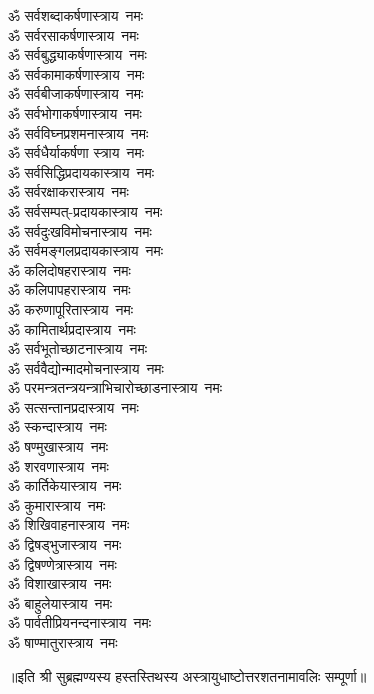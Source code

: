 \begin{flushleft}
\begin{multicols}{2}
ॐ सर्वशब्दाकर्षणास्त्राय~नमः\\
ॐ सर्वरसाकर्षणास्त्राय~नमः\\
ॐ सर्वबुद्ध्याकर्षणास्त्राय~नमः\\
ॐ सर्वकामाकर्षणास्त्राय~नमः\\
ॐ सर्वबीजाकर्षणास्त्राय~नमः\hfill{}\\
ॐ सर्वभोगाकर्षणास्त्राय~नमः\\
ॐ सर्वविघ्नप्रशमनास्त्राय~नमः\\
ॐ सर्वधैर्याकर्षणा स्त्राय~नमः\\
ॐ सर्वसिद्धिप्रदायकास्त्राय~नमः\\
ॐ सर्वरक्षाकरास्त्राय~नमः\\
ॐ सर्वसम्पत्-प्रदायकास्त्राय~नमः\\
ॐ सर्वदुःखविमोचनास्त्राय~नमः\\
ॐ सर्वमङ्गलप्रदायकास्त्राय~नमः\\
ॐ कलिदोषहरास्त्राय~नमः\\
ॐ कलिपापहरास्त्राय~नमः\hfill{}\\
ॐ करुणापूरितास्त्राय~नमः\\
ॐ कामितार्थप्रदास्त्राय~नमः\\
ॐ सर्वभूतोच्छाटनास्त्राय~नमः \\
ॐ सर्ववैद्योन्मादमोचनास्त्राय~नमः \\
ॐ परमन्त्रतन्त्रयन्त्राभिचारो\-च्छाडनास्त्राय~नमः\\
ॐ सत्सन्तानप्रदास्त्राय~नमः\\
ॐ स्कन्दास्त्राय~नमः\\
ॐ षण्मुखास्त्राय~नमः\\
ॐ शरवणास्त्राय~नमः\\
ॐ कार्तिकेयास्त्राय~नमः\hfill{}\\
ॐ कुमारास्त्राय~नमः\\
ॐ शिखिवाहनास्त्राय~नमः\\
ॐ द्विषड्भुजास्त्राय~नमः\\
ॐ द्विषण्णेत्रास्त्राय~नमः\\
ॐ विशाखास्त्राय~नमः\\
ॐ बाहुलेयास्त्राय~नमः\\
ॐ पार्वतीप्रियनन्दनास्त्राय~नमः\\
ॐ षाण्मातुरास्त्राय~नमः\\
\end{multicols}
\end{flushleft}
\centerline{॥इति श्री सुब्रह्मण्यस्य हस्तस्तिथस्य अस्त्रायुधाष्टोत्तरशतनामावलिः सम्पूर्णा॥}
